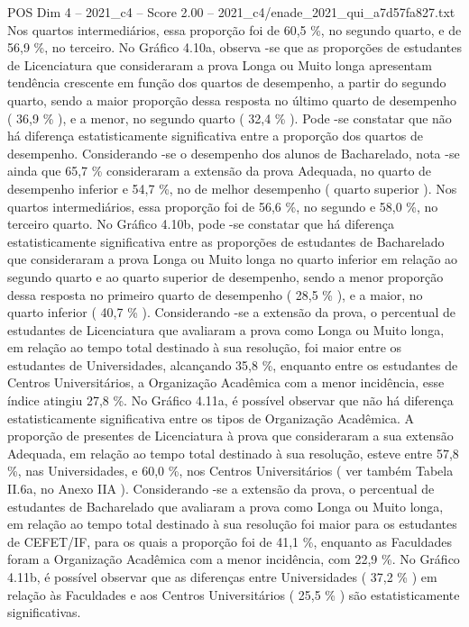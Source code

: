 \begin{textsample}{POS Dim 4 – 2021\_c4 – Score 2.00 – 2021\_c4/enade\_2021\_qui\_a7d57fa827.txt}
Nos quartos intermediários, essa proporção foi de 60,5 \%, no segundo quarto, e de 56,9 \%, no terceiro.
No Gráfico 4.10a, observa -se que as proporções de estudantes de Licenciatura que consideraram a prova Longa ou Muito longa apresentam tendência crescente em função dos quartos de desempenho, a partir do segundo quarto, sendo a maior proporção dessa resposta no último quarto de desempenho ( 36,9 \% ), e a menor, no segundo quarto ( 32,4 \% ).
Pode -se constatar que não há diferença estatisticamente significativa entre a proporção dos quartos de desempenho.
Considerando -se o desempenho dos alunos de Bacharelado, nota -se ainda que 65,7 \% consideraram a extensão da prova Adequada, no quarto de desempenho inferior e 54,7 \%, no de melhor desempenho ( quarto superior ).
Nos quartos intermediários, essa proporção foi de 56,6 \%, no segundo e 58,0 \%, no terceiro quarto.
No Gráfico 4.10b, pode -se constatar que há diferença estatisticamente significativa entre as proporções de estudantes de Bacharelado que consideraram a prova Longa ou Muito longa no quarto inferior em relação ao segundo quarto e ao quarto superior de desempenho, sendo a menor proporção dessa resposta no primeiro quarto de desempenho ( 28,5 \% ), e a maior, no quarto inferior ( 40,7 \% ).
Considerando -se a extensão da prova, o percentual de estudantes de Licenciatura que avaliaram a prova como Longa ou Muito longa, em relação ao tempo total destinado à sua resolução, foi maior entre os estudantes de Universidades, alcançando 35,8 \%, enquanto entre os estudantes de Centros Universitários, a Organização Acadêmica com a menor incidência, esse índice atingiu 27,8 \%.
No Gráfico 4.11a, é possível observar que não há diferença estatisticamente significativa entre os tipos de Organização Acadêmica.
A proporção de presentes de Licenciatura à prova que consideraram a sua extensão Adequada, em relação ao tempo total destinado à sua resolução, esteve entre 57,8 \%, nas Universidades, e 60,0 \%, nos Centros Universitários ( ver também Tabela II.6a, no Anexo IIA ).
Considerando -se a extensão da prova, o percentual de estudantes de Bacharelado que avaliaram a prova como Longa ou Muito longa, em relação ao tempo total destinado à sua resolução foi maior para os estudantes de CEFET/IF, para os quais a proporção foi de 41,1 \%, enquanto as Faculdades foram a Organização Acadêmica com a menor incidência, com 22,9 \%.
No Gráfico 4.11b, é possível observar que as diferenças entre Universidades ( 37,2 \% ) em relação às Faculdades e aos Centros Universitários ( 25,5 \% ) são estatisticamente significativas.

\end{textsample}

